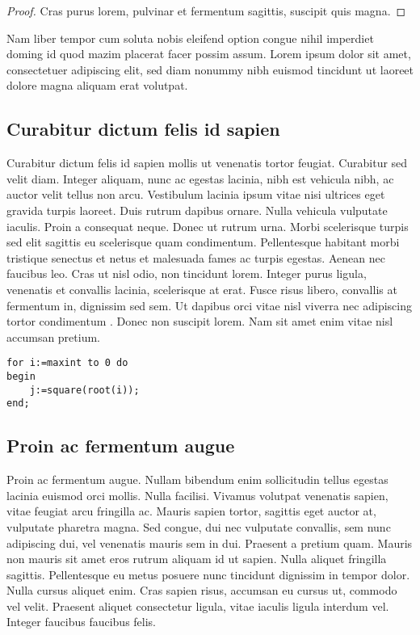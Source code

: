\documentclass[a4paper,USenglish,english]{lipics-v2018}
\begin{document}
\begin{proof}
Cras purus lorem, pulvinar et fermentum sagittis, suscipit quis magna.
\end{proof}

\begin{theorem}
\label{theorem:curabitur}
Nam liber tempor cum soluta nobis eleifend option congue nihil imperdiet doming id quod mazim placerat facer possim assum. Lorem ipsum dolor sit amet, consectetuer adipiscing elit, sed diam nonummy nibh euismod tincidunt ut laoreet dolore magna aliquam erat volutpat.
\end{theorem}

\subsection{Curabitur dictum felis id sapien}

Curabitur dictum felis id sapien mollis ut venenatis tortor feugiat. Curabitur sed velit diam. Integer aliquam, nunc ac egestas lacinia, nibh est vehicula nibh, ac auctor velit tellus non arcu. Vestibulum lacinia ipsum vitae nisi ultrices eget gravida turpis laoreet. Duis rutrum dapibus ornare. Nulla vehicula vulputate iaculis. Proin a consequat neque. Donec ut rutrum urna. Morbi scelerisque turpis sed elit sagittis eu scelerisque quam condimentum. Pellentesque habitant morbi tristique senectus et netus et malesuada fames ac turpis egestas. Aenean nec faucibus leo. Cras ut nisl odio, non tincidunt lorem. Integer purus ligula, venenatis et convallis lacinia, scelerisque at erat. Fusce risus libero, convallis at fermentum in, dignissim sed sem. Ut dapibus orci vitae nisl viverra nec adipiscing tortor condimentum \cite{DBLP:journals/cacm/Dijkstra68a}. Donec non suscipit lorem. Nam sit amet enim vitae nisl accumsan pretium. 

\begin{lstlisting}[caption={Useless code},label=list:8-6,captionpos=t,float,abovecaptionskip=-\medskipamount]
for i:=maxint to 0 do 
begin 
    j:=square(root(i));
end;
\end{lstlisting}

\subsection{Proin ac fermentum augue}

Proin ac fermentum augue. Nullam bibendum enim sollicitudin tellus egestas lacinia euismod orci mollis. Nulla facilisi. Vivamus volutpat venenatis sapien, vitae feugiat arcu fringilla ac. Mauris sapien tortor, sagittis eget auctor at, vulputate pharetra magna. Sed congue, dui nec vulputate convallis, sem nunc adipiscing dui, vel venenatis mauris sem in dui. Praesent a pretium quam. Mauris non mauris sit amet eros rutrum aliquam id ut sapien. Nulla aliquet fringilla sagittis. Pellentesque eu metus posuere nunc tincidunt dignissim in tempor dolor. Nulla cursus aliquet enim. Cras sapien risus, accumsan eu cursus ut, commodo vel velit. Praesent aliquet consectetur ligula, vitae iaculis ligula interdum vel. Integer faucibus faucibus felis. 
\end{document}
